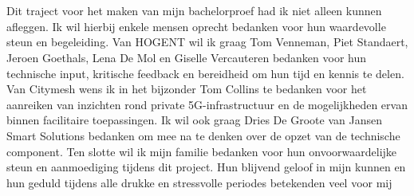 
\chapter*{}%
\label{ch:voorwoord}


Dit traject voor het maken van mijn bachelorproef had ik niet alleen kunnen afleggen. Ik wil hierbij enkele mensen oprecht bedanken voor hun waardevolle steun en begeleiding.
\newline
\newline
Van HOGENT wil ik graag Tom Venneman, Piet Standaert, Jeroen Goethals, Lena De Mol en Giselle Vercauteren bedanken voor hun technische input, kritische feedback en bereidheid om hun tijd en kennis te delen. Van Citymesh wens ik in het bijzonder Tom Collins te bedanken voor het aanreiken van inzichten rond private 5G-infrastructuur en de mogelijkheden ervan binnen facilitaire toepassingen. Ik wil ook graag Dries De Groote van Jansen Smart Solutions bedanken om mee na te denken over de opzet van de technische component.
\newline
\newline
Ten slotte wil ik mijn familie bedanken voor hun onvoorwaardelijke steun en aanmoediging tijdens dit project. Hun blijvend geloof in mijn kunnen en hun geduld tijdens alle drukke en stressvolle periodes betekenden veel voor mij

